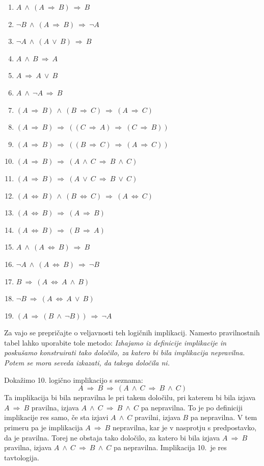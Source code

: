 \documentclass[11pt,paper=b5,footinclude,headinclude]{scrbook} %
\newcounter{example}
\def\ali {{~\vee~}}
\def\inn {{~\wedge~}}
\def\sledi {{~\Rightarrow~}}
\def\cee {{~\Leftrightarrow~}}
\begin{document}
\begin{enumerate}
  \item $A \inn (A \sledi B) \sledi B$
  \item $\neg B \inn (A \sledi B) \sledi \neg A$
  \item $\neg A \inn (A \ali B) \sledi B$
  \item $A \inn B \sledi A$
  \item $A \sledi A\ali B$
  \item $A \inn \neg A\sledi B$
  \item $(A \sledi B) \inn (B \sledi C) \sledi (A\sledi C)$
  \item $(A \sledi B) \sledi ((C \sledi A) \sledi (C\sledi B))$
  \item $(A \sledi B) \sledi ((B \sledi C) \sledi (A\sledi C))$
  \item $(A \sledi B) \sledi (A\inn C \sledi B\inn C)$
  \item $(A \sledi B) \sledi (A\ali C \sledi B\ali C)$
  \item $(A \cee B) \inn (B\cee C) \sledi (A\cee C)$
  \item $(A \cee B) \sledi (A\sledi B)$
  \item $(A \cee B) \sledi (B\sledi A)$
  \item $A \inn (A \cee B) \sledi B$
  \item $\neg A \inn (A \cee B) \sledi \neg B$
  \item $B\sledi (A\cee A \inn B)$
  \item $\neg B\sledi (A\cee A \ali B)$
  \item $(A\sledi (B\inn \neg B)) \sledi \neg A$
\end{enumerate}

Za vajo se prepričajte o veljavnosti teh logičnih implikacij. Namesto pravilnostnih tabel lahko uporabite tole metodo:  {\em Izhajamo iz definicije implikacije in poskušamo konstruirati tako določilo, za katero bi bila implikacija nepravilna. Potem se mora seveda izkazati, da takega določila ni.}

\bigskip
\begin{example*}
Dokažimo 10. logično implikacijo s seznama:
$$A \sledi B \sledi (A\inn C \sledi B\inn C)$$
Ta implikacija bi bila nepravilna le pri takem določilu, pri katerem bi bila izjava
$A \sledi B$ pravilna, izjava $A\inn C \sledi B\inn C$ pa nepravilna. To je po definiciji implikacije res samo, če sta izjavi $A\inn C$ pravilni, izjava $B$ pa nepravilna.
V tem primeru pa je implikacija $A \sledi B$ nepravilna, kar je v nasprotju s predpostavko, da je
pravilna. Torej ne obstaja tako določilo, za katero bi bila izjava  $A \sledi B$ pravilna, izjava $A\inn C \sledi B\inn C$ pa nepravilna. Implikacija 10.~je res tavtologija.\end{example*}
\end{document}
